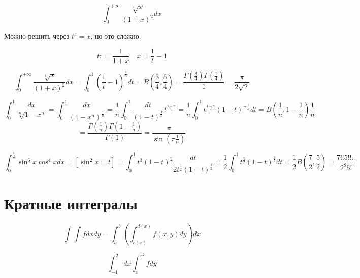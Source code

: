 \begin{exercise}[3845]
    \[\int_0^{+\infty} \frac{\sqrt[4]{x}}{(1 + x)^2} dx\]

    Можно решить через \(t^4 = x\), но это сложно.

    \[t : = \frac{1}{1 + x} \quad x = \frac{1}{t} - 1\]

    \[\int_0^{+\infty} \frac{\sqrt[4]{x}}{(1 + x)^2} dx = \int_0^1 \left( \frac{1}{t} - 1 \right)^{\frac{1}{4}} dt = B\left( \frac{3}{4}, \frac{5}{4} \right) = \frac{\Gamma(\frac{3}{4})\Gamma(\frac{1}{4})}{1} = \frac{\pi}{2 \sqrt{2}} \]
\end{exercise}

\begin{exercise}[3849]
    \[\int_0^1 \frac{dx}{\sqrt[n]{1 - x^n}} = \int_0^1 \frac{dx}{(1 - x^n)^{\frac{1}{n}}} = \frac{1}{n} \int_0^1 \frac{dt}{(1 - t)^{\frac{1}{n}}} t^{\frac{1 - n}{n}} = \frac{1}{n} \int_0^1 t^{\frac{1 - n}{n}} (1 - t)^{ - \frac{1}{n}} dt = B\left( \frac{1}{n}, 1 - \frac{1}{n} \right) \frac{1}{n}\]
    \[ = \frac{\Gamma(\frac{1}{n})\Gamma(1 - \frac{1}{n})}{\Gamma(1)} = \frac{\pi}{\sin\left( \pi \frac{1}{n} \right)} \]
\end{exercise}

\begin{exercise}[3848]
    \[\int_0^{\frac{\pi}{2}} \sin^6 x \cos^4 x dx = [\sin^2 x = t] = \int_0^1 t^3 (1 - t)^2 \frac{dt}{2t^{\frac{1}{2}}(1 - t)^{\frac{1}{2}}} = \frac{1}{2}\int_0^1 t^{\frac{5}{2}} (1 - t)^{\frac{3}{2}} dt = \frac{1}{2} B\left( \frac{7}{2}, \frac{5}{2} \right) = \frac{7!!5!!\pi}{2^8 5!} \]
\end{exercise}

\section*{Кратные интегралы}

\begin{figure}[h]
    \centering
    
\end{figure}

\[\int \int f dx dy = \int_a^b \left( \int_{c(x)}^{d(x)} f(x, y) dy \right) dx\]

\begin{exercise}
    \[\int_{ - 1}^2 dx \int_x^{x^2} f dy\]
\end{exercise}

